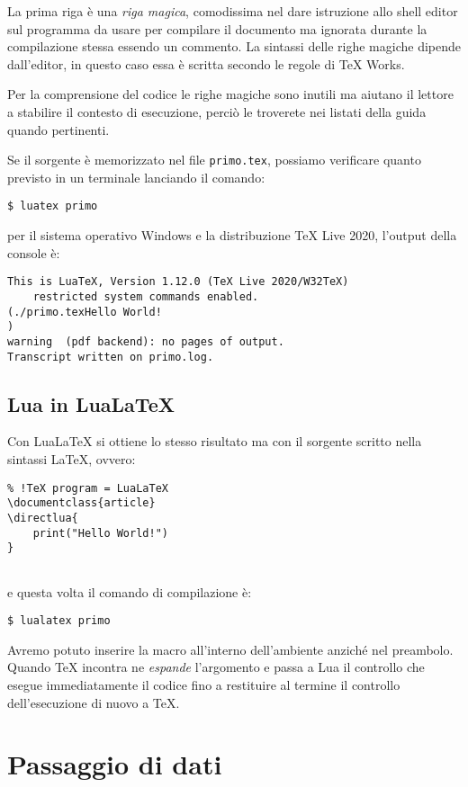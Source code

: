 La prima riga è una \emph{riga magica}, comodissima nel dare istruzione allo
shell editor sul programma da usare per compilare il documento ma ignorata
durante la compilazione stessa essendo un commento. La sintassi delle righe
magiche dipende dall'editor, in questo caso essa è scritta secondo le regole di
TeX Works.

Per la comprensione del codice le righe magiche sono inutili ma aiutano il
lettore a stabilire il contesto di esecuzione, perciò le troverete nei listati
della guida quando pertinenti.

Se il sorgente è memorizzato nel file \texttt{primo.tex}, possiamo verificare
quanto previsto in un terminale lanciando il comando:
\begin{Verbatim}
$ luatex primo
\end{Verbatim}
per il sistema operativo Windows e la distribuzione TeX Live 2020, l'output
della console è:
\begin{Verbatim}
This is LuaTeX, Version 1.12.0 (TeX Live 2020/W32TeX) 
    restricted system commands enabled.
(./primo.texHello World!
)
warning  (pdf backend): no pages of output.
Transcript written on primo.log.
\end{Verbatim}


\subsection{Lua in Lua\LaTeX}

Con Lua\LaTeX{} si ottiene lo stesso risultato ma con il sorgente scritto nella
sintassi \LaTeX, ovvero:
\begin{Verbatim}
% !TeX program = LuaLaTeX
\documentclass{article}
\directlua{
    print("Hello World!")
}


\end{Verbatim}
e questa volta il comando di compilazione è:
\begin{Verbatim}
$ lualatex primo
\end{Verbatim}

Avremo potuto inserire la macro all'interno dell'ambiente  anziché
nel preambolo. Quando \TeX{} incontra  ne \emph{espande}
l'argomento e passa a Lua il controllo che esegue immediatamente il codice fino
a restituire al termine il controllo dell'esecuzione di nuovo a \TeX.


\section{Passaggio di dati}

